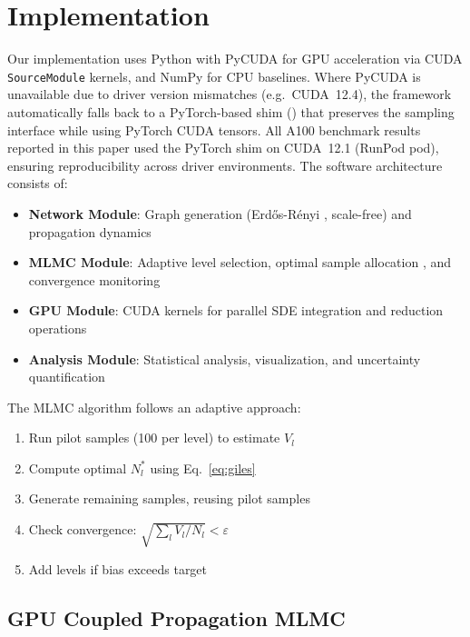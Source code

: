\documentclass[pdflatex,sn-mathphys-num]{sn-jnl}
\theoremstyle{thmstyleone}%
\theoremstyle{thmstyletwo}%
\theoremstyle{thmstylethree}%
\begin{document}
\section{Implementation}

Our implementation uses Python with PyCUDA \cite{nvidia2020cuda} for GPU acceleration via CUDA
\texttt{SourceModule} kernels, and NumPy for CPU baselines. Where PyCUDA is unavailable due to
driver version mismatches (e.g.\ CUDA~12.4), the framework automatically falls back to a
PyTorch-based shim () that preserves the sampling interface while using
PyTorch CUDA tensors. All A100 benchmark results reported in this paper used the PyTorch shim on
CUDA~12.1 (RunPod pod), ensuring reproducibility across driver environments. The software
architecture consists of:

\begin{itemize}
    \item \textbf{Network Module}: Graph generation (Erd\H{o}s-R\'enyi \cite{hofstad2016},
    scale-free) and propagation dynamics
    \item \textbf{MLMC Module}: Adaptive level selection, optimal sample allocation
    \cite{collier2015}, and convergence monitoring
    \item \textbf{GPU Module}: CUDA kernels for parallel SDE integration and reduction operations
    \item \textbf{Analysis Module}: Statistical analysis, visualization, and uncertainty
    quantification
\end{itemize}

The MLMC algorithm follows an adaptive approach:
\begin{enumerate}
    \item Run pilot samples (100 per level) to estimate $V_l$
    \item Compute optimal $N_l^*$ using Eq.~\eqref{eq:giles}
    \item Generate remaining samples, reusing pilot samples
    \item Check convergence: $\sqrt{\sum_l V_l/N_l} < \varepsilon$
    \item Add levels if bias exceeds target
\end{enumerate}

\subsection{GPU Coupled Propagation MLMC}
\label{subsec:gpu_coupled}
\end{document}
